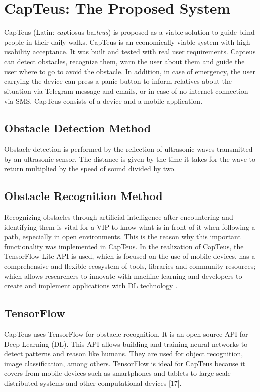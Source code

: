\documentclass{svproc}
\begin{document}
\section{CapTeus: The Proposed System}

CapTeus (Latin: \textit{cap}tiosus bal\textit{teus}) is proposed as a viable solution to guide blind
people in their daily walks. CapTeus is an economically viable system with high
usability acceptance. It was built and tested with real user requirements. Capteus
can detect obstacles, recognize them, warn the user about them and guide the
user where to go to avoid the obstacle. In addition, in case of emergency, the
user carrying the device can press a panic button to inform relatives about the
situation via Telegram message and emails, or in case of no internet connection
via SMS. CapTeus consists of a device and a mobile application.

\subsection{Obstacle Detection Method}

Obstacle detection is performed by the reflection of ultrasonic waves transmitted
by an ultrasonic sensor. The distance is given by the time it takes for the wave
to return multiplied by the speed of sound divided by two.

\subsection{Obstacle Recognition Method}

Recognizing obstacles through artificial intelligence after encountering and identifying
them is vital for a VIP to know what is in front of it when following a
path, especially in open environments. This is the reason why this important
functionality was implemented in CapTeus. In the realization of CapTeus, the
TensorFlow Lite API is used, which is focused on the use of mobile devices,
has a comprehensive and flexible ecosystem of tools, libraries and community
resources; which allows researchers to innovate with machine learning and developers
to create and implement applications with DL technology \cite{Google}.

\subsection{TensorFlow}
CapTeus uses TensorFlow for obstacle recognition. It is an open source API for
Deep Learning (DL). This API allows building and training neural networks to
detect patterns and reason like humans. They are used for object recognition,
image classification, among others. TensorFlow is ideal for CapTeus because
it covers from mobile devices such as smartphones and tablets to large-scale
distributed systems and other computational devices [17].
\end{document}
